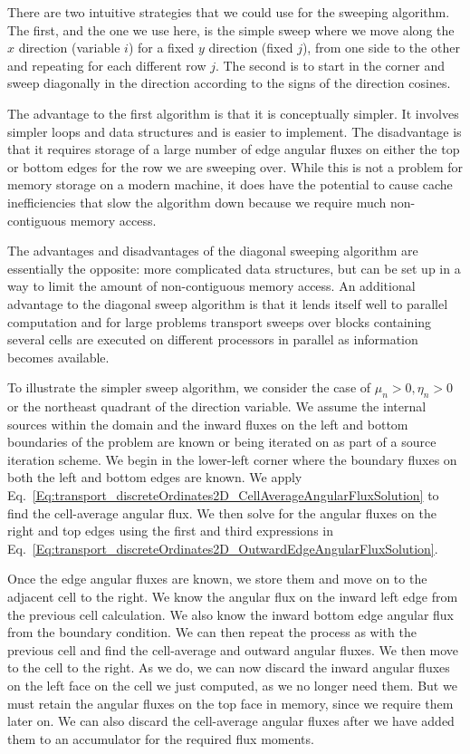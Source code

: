 There are two intuitive strategies that we could use for the sweeping algorithm. The first, and the one we use here, is the simple sweep where we move along the $x$ direction (variable $i$) for a fixed $y$ direction (fixed $j$), from one side to the other and repeating for each different row $j$. The second is to start in the corner and sweep diagonally in the direction according to the signs of the direction cosines. 

The advantage to the first algorithm is that it is conceptually simpler. It involves simpler loops and data structures and is easier to implement. The disadvantage is that it requires storage of a large number of edge angular fluxes on either the top or bottom edges for the row we are sweeping over. While this is not a problem for memory storage on a modern machine, it does have the potential to cause cache inefficiencies that slow the algorithm down because we require much non-contiguous memory access. 

The advantages and disadvantages of the diagonal sweeping algorithm are essentially the opposite: more complicated data structures, but can be set up in a way to limit the amount of non-contiguous memory access. An additional advantage to the diagonal sweep algorithm is that it lends itself well to parallel computation and for large problems transport sweeps over blocks containing several cells are executed on different processors in parallel as information becomes available. 

To illustrate the simpler sweep algorithm, we consider the case of $\mu_n > 0, \eta_n > 0$ or the northeast quadrant of the direction variable. We assume the internal sources within the domain and the inward fluxes on the left and bottom boundaries of the problem are known or being iterated on as part of a source iteration scheme. We begin in the lower-left corner where the boundary fluxes on both the left and bottom edges are known. We apply Eq.~\eqref{Eq:transport_discreteOrdinates2D_CellAverageAngularFluxSolution} to find the cell-average angular flux. We then solve for the angular fluxes on the right and top edges using the first and third expressions in Eq.~\eqref{Eq:transport_discreteOrdinates2D_OutwardEdgeAngularFluxSolution}.

Once the edge angular fluxes are known, we store them and move on to the adjacent cell to the right. We know the angular flux on the inward left edge from the previous cell calculation. We also know the inward bottom edge angular flux from the boundary condition. We can then repeat the process as with the previous cell and find the cell-average and outward angular fluxes. We then move to the cell to the right. As we do, we can now discard the inward angular fluxes on the left face on the cell we just computed, as we no longer need them. But we must retain the angular fluxes on the top face in memory, since we require them later on. We can also discard the cell-average angular fluxes after we have added them to an accumulator for the required flux moments.

